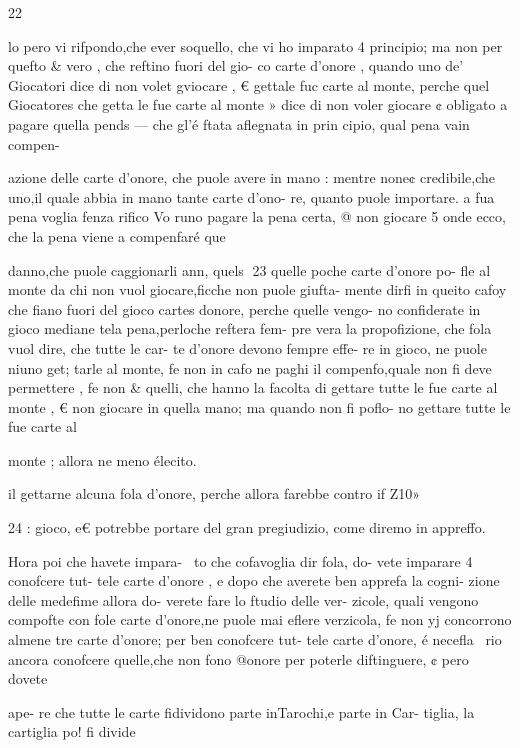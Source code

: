 {{{{{{{ 
 

 

 

 

 

 

 

22

lo pero vi rifpondo,che ever
soquello, che vi ho imparato 4
principio; ma non per quefto &
vero , che reftino fuori del gio-
co carte d’onore , quando uno
de’ Giocatori dice di non volet
gviocare , € gettale fuc carte al
monte, perche quel Giocatores
che getta le fue carte al monte »
dice di non voler giocare ¢
obligato a pagare quella pends —
che gl’é ftata aflegnata in prin
cipio, qual pena vain compen-
{azione delle carte d’onore, che
puole avere in mano : mentre
none¢ credibile,che uno,il quale
abbia in mano tante carte d’ono-
re, quanto puole importare. a
fua pena voglia fenza rifico Vo
runo pagare la pena certa, @
non giocare 5 onde ecco, che la
pena viene a compenfaré que

danno,che puole caggionarli ann,
quels
23
quelle poche carte d’onore po-
fle al monte da chi non vuol
giocare,ficche non puole giufta-
mente dirfi in queito cafoy che
fiano fuori del gioco cartes
donore, perche quelle vengo-
no confiderate in gioco mediane
tela pena,perloche reftera fem-
pre vera la propofizione, che
fola vuol dire, che tutte le car-
te d’onore devono fempre effe-
re in gioco, ne puole niuno get;
tarle al monte, fe non in cafo
ne paghi il compenfo,quale non
fi deve permettere , fe non &
quelli, che hanno la facolta di
gettare tutte le fue carte al
monte , € non giocare in quella
mano; ma quando non fi poflo-
no gettare tutte le fue carte al

monte ; allora ne meno élecito.

il gettarne alcuna fola d’onore,
perche allora farebbe contro if
Z10»

 

 
 

24 :
gioco, e€ potrebbe portare del
gran pregiudizio, come diremo
in appreffo.

Hora poi che havete impara-~
to che cofavoglia dir fola, do-
vete imparare 4 conofcere tut-
tele carte d’onore , e dopo che
averete ben apprefa la cogni-
zione delle medefime allora do-
verete fare lo ftudio delle ver-
zicole, quali vengono compofte
con fole carte d’onore,ne puole
mai eflere verzicola, fe non yj
concorrono almene tre carte
d’onore; per ben conofcere tut-
tele carte d’onore, é necefla~
rio ancora conofcere quelle,che
non fono @onore per poterle
diftinguere, ¢ pero dovete {ape-
re che tutte le carte fidividono
parte inTarochi,e parte in Car-
tiglia, la cartiglia po! fi divide

}}}}}}}}}
